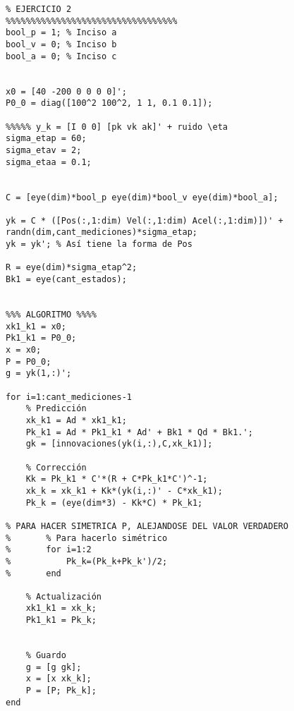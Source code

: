 
	\begin{lstlisting}[caption=Script para la resolución del ejercicio 2]
%%%%%%%%%%%%%%%%%%%%%%%%%%%%%%%%%%
% EJERCICIO 2
%%%%%%%%%%%%%%%%%%%%%%%%%%%%%%%%%%
bool_p = 1;	% Inciso a
bool_v = 0;	% Inciso b
bool_a = 0;	% Inciso c


x0 = [40 -200 0 0 0 0]';
P0_0 = diag([100^2 100^2, 1 1, 0.1 0.1]);

%%%%% y_k = [I 0 0] [pk vk ak]' + ruido \eta
sigma_etap = 60;
sigma_etav = 2;
sigma_etaa = 0.1;


C = [eye(dim)*bool_p eye(dim)*bool_v eye(dim)*bool_a];

yk = C * ([Pos(:,1:dim) Vel(:,1:dim) Acel(:,1:dim)])' + randn(dim,cant_mediciones)*sigma_etap;
yk = yk'; % Así tiene la forma de Pos

R = eye(dim)*sigma_etap^2;
Bk1 = eye(cant_estados);


%%% ALGORITMO %%%%
xk1_k1 = x0;
Pk1_k1 = P0_0;
x = x0;
P = P0_0;
g = yk(1,:)';

for i=1:cant_mediciones-1
	% Predicción
	xk_k1 = Ad * xk1_k1;
	Pk_k1 =	Ad * Pk1_k1 * Ad' + Bk1 * Qd * Bk1.';
	gk = [innovaciones(yk(i,:),C,xk_k1)];

	% Corrección
	Kk = Pk_k1 * C'*(R + C*Pk_k1*C')^-1;
	xk_k = xk_k1 + Kk*(yk(i,:)' - C*xk_k1);
	Pk_k = (eye(dim*3) - Kk*C) * Pk_k1;
	
% PARA HACER SIMETRICA P, ALEJANDOSE DEL VALOR VERDADERO	
%		% Para hacerlo simétrico
%		for i=1:2
%			Pk_k=(Pk_k+Pk_k')/2;
%		end

	% Actualización
	xk1_k1 = xk_k;
	Pk1_k1 = Pk_k;


	% Guardo
	g = [g gk];
	x = [x xk_k];
	P = [P; Pk_k];
end

	\end{lstlisting}
